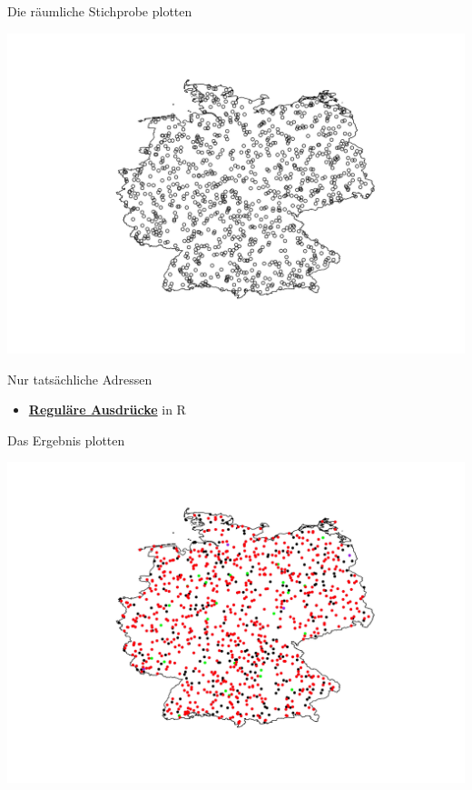 \documentclass[ignorenonframetext,]{beamer}
\providecommand{\tightlist}{%
  \setlength{\itemsep}{0pt}\setlength{\parskip}{0pt}}
\begin{document}
\begin{frame}{Die räumliche Stichprobe plotten}
\protect\hypertarget{die-raumliche-stichprobe-plotten}{}

\includegraphics{Shapefiles_files/figure-beamer/unnamed-chunk-21-1.pdf}

\end{frame}

\begin{frame}{Nur tatsächliche Adressen}
\protect\hypertarget{nur-tatsachliche-adressen}{}

\begin{itemize}
\tightlist
\item
  \href{http://stat545.com/block022_regular-expression.html}{\textbf{Reguläre
  Ausdrücke}} in R
\end{itemize}

\end{frame}

\begin{frame}{Das Ergebnis plotten}
\protect\hypertarget{das-ergebnis-plotten}{}

\includegraphics{Shapefiles_files/figure-beamer/unnamed-chunk-24-1.pdf}

\end{frame}
\end{document}
